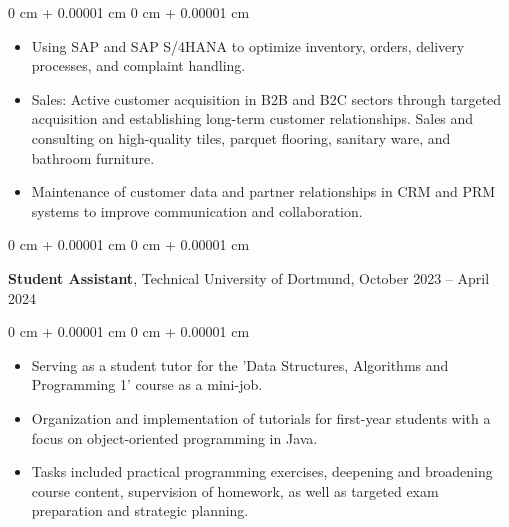 \documentclass[10pt, letterpaper]{article}
\newenvironment{highlights}{
    \begin{itemize}[
        topsep=0.10 cm,
        parsep=0.10 cm,
        partopsep=0pt,
        itemsep=0pt,
        leftmargin=0 cm + 10pt
    ]
}{
    \end{itemize}
} %
\newenvironment{onecolentry}{
    \begin{adjustwidth}{
        0 cm + 0.00001 cm
    }{
        0 cm + 0.00001 cm
    }
}{
    \end{adjustwidth}
} %
\newenvironment{twocolentry}[2][]{
    \onecolentry
    \def\secondColumn{#2}
    \setcolumnwidth{\fill, 4.5 cm}
    \begin{paracol}{2}
}{
    \switchcolumn \raggedleft \secondColumn
    \end{paracol}
    \endonecolentry
} %
\begin{document}
        \vspace{0.10 cm}
        \begin{onecolentry}
            \begin{highlights}
                \item Using SAP and SAP S/4HANA to optimize inventory, orders, delivery processes, and complaint handling.

               \item Sales: Active customer acquisition in B2B and B2C sectors through targeted acquisition and establishing long-term customer relationships. Sales and consulting on high-quality tiles, parquet flooring, sanitary ware, and bathroom furniture.




                \item Maintenance of customer data and partner relationships in CRM and PRM systems to improve communication and collaboration.

               
                 


               
            \end{highlights}
        \end{onecolentry}


        \vspace{1 cm}
 
        \begin{twocolentry}{
            October 2023 – April 2024
        }
            \textbf{Student Assistant}, Technical University of Dortmund, \end{twocolentry}

       \vspace{0.10 cm}
\begin{onecolentry}
    \begin{highlights}
        \item Serving as a student tutor for the 'Data Structures, Algorithms and Programming 1' course as a mini-job.
        \item Organization and implementation of tutorials for first-year students with a focus on object-oriented programming in Java.
        \item Tasks included practical programming exercises, deepening and broadening course content, supervision of homework, as well as targeted exam preparation and strategic planning.
       
    \end{highlights}
\end{onecolentry}
\end{document}
